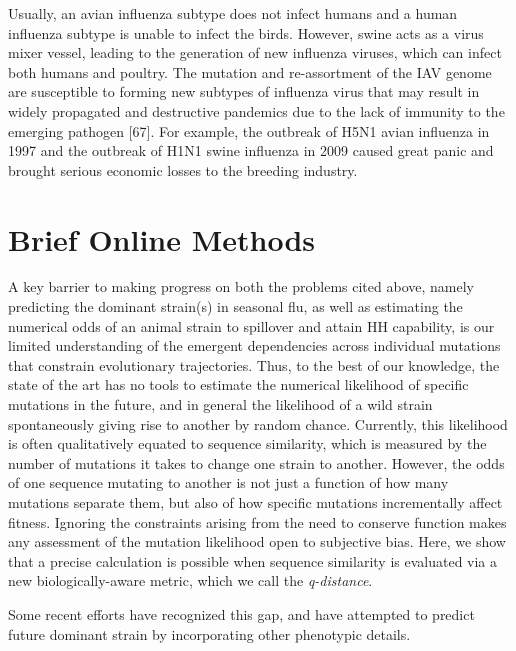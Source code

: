 \documentclass[onecolumn, compsoc,10pt]{IEEEtran}
\def\METHODS{Online Methods\xspace}
\begin{document}
{  Usually, an avian influenza subtype does not infect humans and a human influenza subtype is unable to infect the birds. However, swine acts as a virus mixer vessel, leading to the generation of new influenza viruses, which can infect both humans and poultry. The mutation and re-assortment of the IAV genome are susceptible to forming new subtypes of influenza virus that may result in widely propagated and destructive pandemics due to the lack of immunity to the emerging pathogen [67]. For example, the outbreak of H5N1 avian influenza in 1997 and the outbreak of H1N1 swine influenza in 2009 caused great panic and brought serious economic losses to the breeding industry.



}


\section*{Brief \METHODS}
A key barrier to making progress  on both the problems cited above, namely predicting the dominant strain(s) in seasonal flu, as well as estimating the numerical odds of an animal strain  to spillover and attain HH capability,  is our limited understanding of the emergent dependencies across individual mutations that  constrain evolutionary trajectories. Thus, to the best of our knowledge, the state of the art has no tools to estimate the numerical likelihood of specific mutations in the future, and in general  the likelihood of a wild strain spontaneously giving rise to another by random chance. Currently, this likelihood is often qualitatively equated to sequence similarity, which is measured by the number of mutations it takes to change one strain to another. However, the odds of one sequence mutating to another is not just a function of how many mutations separate them, but also of how specific mutations incrementally affect fitness. Ignoring the constraints arising from the need to conserve function makes any assessment of the mutation likelihood open to subjective bias. Here, we show that a precise calculation is possible when sequence similarity is evaluated via a new biologically-aware metric, which we call the \textit{q-distance}.

Some recent efforts have recognized this gap, and have attempted to predict future dominant strain by incorporating other phenotypic details. 
\end{document}
